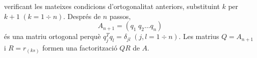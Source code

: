 \documentclass{article}
\begin{document}
verificant les mateixes condicions d'ortogonalitat anteriors, substituint $k$ per $k+1 \; \left( k = 1 \div n \right).$ \newline
Després de $n$ passos,
$$A_{n+1} = \left(q_{1} \; q_{2} \ldots{} q_{n} \right)$$
és una matriu ortogonal perquè $q_{j}^{T}q_{l} = \delta_{jl} \; \left( j, l = 1 \div n \right).$ \newline
\newline
Les matrius $Q = A_{n+1}$ i $R = r_{(ks)}$ formen una factorització $QR$ de $A$.
\end{document}
